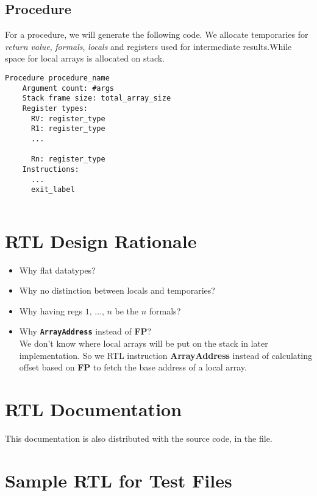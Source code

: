 \documentclass[a4paper,11pt]{article}
\begin{document}
\subsection{Procedure}
For a procedure, we will generate the following code. We allocate temporaries for \textit{return value}, \textit{formals}, \textit{locals} and registers used for intermediate results.While space for local arrays is allocated on stack.
\begin{lstlisting}
Procedure procedure_name
    Argument count: #args
    Stack frame size: total_array_size
    Register types:
      RV: register_type
      R1: register_type
      ...
      
      Rn: register_type
    Instructions:
      ...
      exit_label
    
\end{lstlisting}

\section{RTL Design Rationale}
\begin{itemize}
  \item Why flat datatypes?
  \item Why no distinction between locals and temporaries?
  \item Why having regs $1,\, \dots,\, n$ be the $n$ formals?
  \item Why \texttt{\textbf{ArrayAddress}} instead of \textbf{FP}? \\
  We don't know where local arrays will be put on the stack in later implementation. So we RTL instruction \textbf{ArrayAddress} instead of calculating offset based on \textbf{FP} to fetch the base address of a local array. 
\end{itemize}

\newpage
\appendix
\renewcommand\thesection{Appendix \Alph{section}} %

\section{RTL Documentation}
This documentation is also distributed with the source code, in the
 file.

\section{Sample RTL for Test Files}
\end{document}
